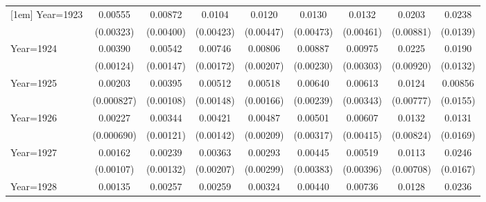 \begin{table}[htbp]
\begin{tabular}{l*{8}{c}}
[1em]
Year=1923           &     0.00555\sym{*}  &     0.00872\sym{**} &      0.0104\sym{**} &      0.0120\sym{***}&      0.0130\sym{***}&      0.0132\sym{***}&      0.0203\sym{**} &      0.0238\sym{*}  \\
                    &   (0.00323)         &   (0.00400)         &   (0.00423)         &   (0.00447)         &   (0.00473)         &   (0.00461)         &   (0.00881)         &    (0.0139)         \\
[1em]
Year=1924           &     0.00390\sym{***}&     0.00542\sym{***}&     0.00746\sym{***}&     0.00806\sym{***}&     0.00887\sym{***}&     0.00975\sym{***}&      0.0225\sym{**} &      0.0190         \\
                    &   (0.00124)         &   (0.00147)         &   (0.00172)         &   (0.00207)         &   (0.00230)         &   (0.00303)         &   (0.00920)         &    (0.0132)         \\
[1em]
Year=1925           &     0.00203\sym{**} &     0.00395\sym{***}&     0.00512\sym{***}&     0.00518\sym{***}&     0.00640\sym{***}&     0.00613\sym{*}  &      0.0124         &     0.00856         \\
                    &  (0.000827)         &   (0.00108)         &   (0.00148)         &   (0.00166)         &   (0.00239)         &   (0.00343)         &   (0.00777)         &    (0.0155)         \\
[1em]
Year=1926           &     0.00227\sym{***}&     0.00344\sym{***}&     0.00421\sym{***}&     0.00487\sym{**} &     0.00501         &     0.00607         &      0.0132         &      0.0131         \\
                    &  (0.000690)         &   (0.00121)         &   (0.00142)         &   (0.00209)         &   (0.00317)         &   (0.00415)         &   (0.00824)         &    (0.0169)         \\
[1em]
Year=1927           &     0.00162         &     0.00239\sym{*}  &     0.00363\sym{*}  &     0.00293         &     0.00445         &     0.00519         &      0.0113         &      0.0246         \\
                    &   (0.00107)         &   (0.00132)         &   (0.00207)         &   (0.00299)         &   (0.00383)         &   (0.00396)         &   (0.00708)         &    (0.0167)         \\
[1em]
Year=1928           &     0.00135\sym{**} &     0.00257         &     0.00259         &     0.00324         &     0.00440         &     0.00736\sym{*}  &      0.0128\sym{*}  &      0.0236         \\

\end{tabular}
\end{table}

